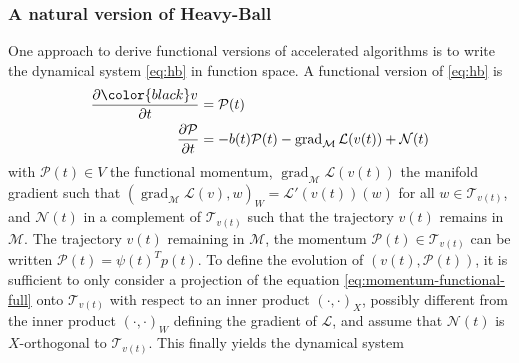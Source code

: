 \documentclass{article}
\theoremstyle{noparens}
\newcommand{\cL}{\mathcal{L}}
\newcommand{\cT}{\mathcal{T}}
\newcommand{\cM}{\mathcal{M}}
\newcommand{\cN}{\mathcal{N}}
\newcommand{\cP}{\mathcal{P}}
\newcommand{\colorM}{\color{black}}
\renewcommand{\v}{{\colorM v}}
\newcommand{\dvdt}{\frac{\partial \v}{\partial t}}
\newcommand{\dPdt}{\frac{\partial \cP}{\partial t}}
\newcommand{\gradM}{\operatorname{grad}_{\cM}}
\begin{document}
\subsubsection{A natural version of Heavy-Ball}
\label{sec:nhb}

One approach to derive functional versions of  accelerated algorithms is to write
the dynamical system \eqref{eq:hb} in function space. A functional version of  \eqref{eq:hb} is
\begin{subequations}
\begin{align}
    \dvdt &= \cP(t) \\
    \dPdt &= -b(t)\cP(t) - \gradM \cL(v(t)) + \cN(t)  \label{eq:momentum-functional-full}
\end{align}\label{eq:functional-V}
\end{subequations}
with $\cP(t) \in V$ the functional momentum, $\gradM \cL(v(t))$ the manifold gradient such that $(\gradM\cL(v), w)_W = \cL'(v(t))(w)$ for all $w \in \cT_{v(t)}$,  and $\cN(t)$ in a complement of $\cT_{v(t)}$ such that the trajectory $v(t)$  remains in $\cM$.
The trajectory $v(t)$ remaining in $\cM$, the momentum $\cP(t) \in \cT_{v(t)}$ can be written $\cP(t)=\psi(t)^T p(t)$.
To define the evolution of $(v(t), \cP(t))$, it is sufficient to only consider a projection of the equation
\eqref{eq:momentum-functional-full} onto  $\cT_{v(t)}$ with respect to an inner product $(\cdot, \cdot)_X$, possibly different from the inner product $(\cdot, \cdot)_W$ defining the  gradient of $\cL$, and assume that $\cN(t)$ is $X$-orthogonal to $\cT_{v(t)}.$ This finally yields the dynamical system
\end{document}
